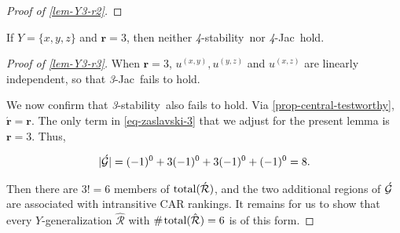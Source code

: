 \documentclass[12pt,a4paper,twoside]{article}
\makeatletter
\newcommand{\srcsize}{\@setfontsize{\srcsize}{3pt}{3pt}}
\newcommand\mdoubleplus{\text{\srcsize$+\mkern-2mu+$}}
\newcommand{\countof}{\mathbin{\#}\hskip1pt}
\newcommand{\hext}{\mathrel{\hat{\mathrel{\mathcal R}}}}
\newcommand{\aext}{\mathrel{\acute{\mathrel{\mathcal R}}}}
\newcommand{\total}{\textup{total}}
\newcommand{\xy}{{(x, y)}}
\newcommand{\yz}{{(y,z)}}
\newcommand{\xz}{{(x,z)}}
\newcommand{\stability}{\textit{4}-\textup{{stability}}}
\newcommand{\threepru}{\textit{3}-\textup{{stability}}}
\newcommand{\fourjac}{\textup{\textit{4}-Jac}}
\newcommand{\threejac}{\textup{\textit{3}-Jac}}
\makeatother
\begin{document}
\begin{appendices}
\begin{proof}[Proof of \cref{lem-Y3-r2}]
\end{proof}

\begin{lemma}\label{lem-Y3-r3}
  If $Y = \{x,y,z\}$ and  $\mathbf{r} = 3$, then neither \stability\ nor
  \fourjac\ hold.
\end{lemma}
\begin{proof}[Proof of \cref{lem-Y3-r3}]
  When $\mathbf r = 3$, $u^{\xy}, u^{\yz}$ and $u^{\xz}$ are linearly
  independent, so that \threejac\ fails to hold.

  We now confirm that \threepru\ also fails to hold.  Via
  \cref{prop-central-testworthy}, $\acute{\mathbf r} = \mathbf r$.  The only
  term in \cref{eq-zaslavski-3} that we adjust for the present lemma is
  $\mathbf{r}=3$. Thus,
\begin{linenomath*}
  \begin{align*}
    \lvert \acute{\mathcal G}\rvert
    = (-1)^{0}+3(-1)^{0}+ 3(-1)^{0}+(-1)^{0} = 8.
  \end{align*}
\end{linenomath*}
\addtocounter{linenumber}{-1}
  Then there are $3!=6$ members of $\total (\aext)$, and the two additional
  regions of $\acute {\mathcal G}$ are associated with intransitive CAR rankings. It
  remains for us to show that every $Y$-{generalization} $\hext$ with
  $\countof \total (\hext) = 6$ is of this form. %
  

\end{proof}
\end{appendices}
\end{document}
